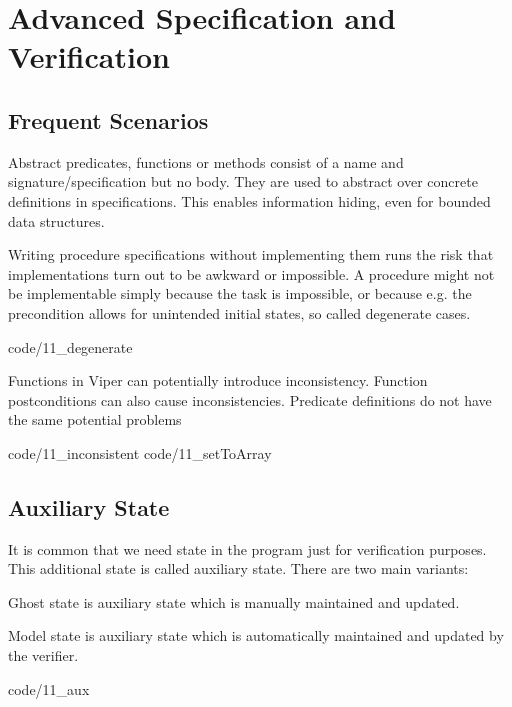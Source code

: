 \section{Advanced Specification and Verification}

\subsection{Frequent Scenarios}
\begin{mytitle}[Abstraction] Abstract predicates, functions or methods consist of a name and signature/specification but no body. They are used to abstract over concrete definitions in specifications. This enables information hiding, even for bounded data structures.
\end{mytitle}
\begin{mytitle} Writing procedure specifications without implementing them runs the risk that implementations turn out to be awkward or impossible. A procedure might not be implementable simply because the task is impossible, or because e.g. the precondition allows for unintended initial states, so called degenerate cases.
\end{mytitle}
 {code/11_degenerate}
\begin{mytitle} Functions in Viper can potentially introduce inconsistency. Function postconditions can also cause inconsistencies. Predicate definitions do not have the same potential problems
\end{mytitle}
 {code/11_inconsistent}
 {code/11_setToArray}


\subsection{Auxiliary State}
\begin{mytitle} It is common that we need state in the program just for verification purposes. This additional state is called auxiliary state. There are two main variants:
    \begin{mysubtitle} Ghost state is auxiliary state which is manually maintained and updated.
    \end{mysubtitle}
    \begin{mysubtitle} Model state is auxiliary state which is automatically maintained and updated by the verifier.
    \end{mysubtitle}
\end{mytitle}
 {code/11_aux}
